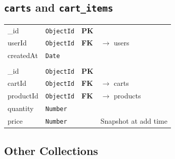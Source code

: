 \documentclass[a4paper,11pt]{article}
\newcommand{\pk}{\textcolor{success}{\textbf{PK}}}
\newcommand{\fk}{\textcolor{warning}{\textbf{FK}}}
\newcommand{\coll}[1]{\textcolor{primary}{\texttt{\textbf{#1}}}}
\newcommand{\dtype}[1]{\textcolor{secondary}{\texttt{#1}}}
\begin{document}
\subsection{\coll{carts} and \coll{cart\_items}}

\begin{tabular}{@{}L{3.2cm}L{2.8cm}C{1.5cm}L{5.5cm}@{}}
\toprule
{}
 \\
\midrule
\_id       & \dtype{ObjectId} & \pk & \\
userId     & \dtype{ObjectId} & \fk & $\to$ users \\
createdAt  & \dtype{Date}     &     & \\
\midrule
{}
 \\
\midrule
\_id        & \dtype{ObjectId} & \pk & \\
cartId      & \dtype{ObjectId} & \fk & $\to$ carts \\
productId   & \dtype{ObjectId} & \fk & $\to$ products \\
quantity    & \dtype{Number}   &     & \\
price       & \dtype{Number}   &     & Snapshot at add time \\
\bottomrule
\end{tabular}

\subsection{Other Collections}
\end{document}
